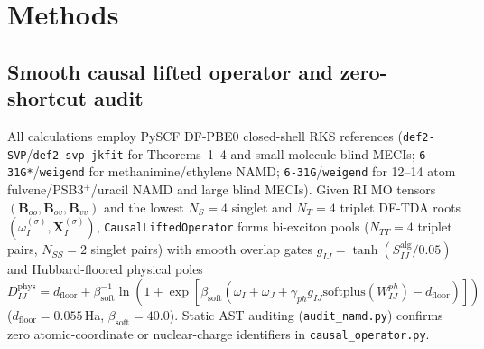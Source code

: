 \documentclass[10pt,twocolumn]{article}
\theoremstyle{natthm}
\begin{document}
\section*{Methods}
\subsection*{Smooth causal lifted operator and zero-shortcut audit}
All calculations employ PySCF\cite{sun2020pyscf} DF-PBE0\cite{adamo1999pbe0} closed-shell RKS references (\texttt{def2-SVP}/\texttt{def2-svp-jkfit}\cite{weigend2005def2,weigend2008jkfit} for Theorems~1--4 and small-molecule blind MECIs; \texttt{6-31G*}/\texttt{weigend} for methanimine/ethylene NAMD; \texttt{6-31G}/\texttt{weigend} for 12--14 atom fulvene/PSB3$^+$/uracil NAMD and large blind MECIs).
Given RI MO tensors $(\mathbf{B}_{oo},\mathbf{B}_{ov},\mathbf{B}_{vv})$ and the lowest $N_S=4$ singlet and $N_T=4$ triplet DF-TDA roots $(\omega_I^{(\sigma)},\mathbf{X}_I^{(\sigma)})$, \texttt{CausalLiftedOperator} forms bi-exciton pools ($N_{TT}=4$ triplet pairs, $N_{SS}=2$ singlet pairs) with smooth overlap gates $g_{IJ}=\tanh(S_{IJ}^{\mathrm{alg}}/0.05)$ and Hubbard-floored physical poles $D_{IJ}^{\mathrm{phys}}=d_{\mathrm{floor}}+\beta_{\mathrm{soft}}^{-1}\ln(1+\exp[\beta_{\mathrm{soft}}(\omega_I+\omega_J+\gamma_{ph}g_{IJ}\mathrm{softplus}(W_{IJ}^{ph})-d_{\mathrm{floor}})])$ ($d_{\mathrm{floor}}=0.055$\,Ha, $\beta_{\mathrm{soft}}=40.0$).
Static AST auditing (\texttt{audit\_namd.py}) confirms zero atomic-coordinate or nuclear-charge identifiers in \texttt{causal\_operator.py}.
\end{document}
